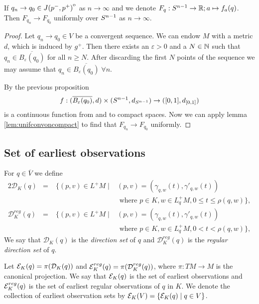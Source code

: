\begin{proposition}\label{prop:funif}
    If $q_n \to q_0\in {\kern0ptJ(p^-,p^+)}^{\mathrm{o}}$ as $n\to \infty$ and we denote $F_q:{S^{n-1}}\to\mathbb{R};a\mapsto f_a(q)$. Then $F_{q_n}\to F_{q_0}$ uniformly over ${S^{n-1}}$ as $n\to \infty$.
\end{proposition}
\begin{proof}
    Let $q_n \to q_0 \in V$ be a convergent sequence. We can endow $M$ with a metric $d$, which is induced by $g^+$. Then there exists an $\varepsilon>0$ and a $N\in \mathbb{N}$ such that $q_n\in \overline{B_\varepsilon(q_0)}$ for all $n\ge N$. After discarding the first $N$ points of the sequence we may assume that $q_n \in \overline{B_\varepsilon(q_0)} \; \forall n$.

    By the previous proposition 
    \begin{align*}
        f:(\overline{B_\varepsilon(q_0)},d)\times({S^{n-1}}, d_{{S^{n-1}}}) \to ([0,1],d_{[0,1]})
    \end{align*} is a continuous function from and to compact spaces. Now we can apply lemma \ref{lem:unifconvoncompact} to find that $F_{q_n}\to F_{q_0}$ uniformly.
     
\end{proof}

\subsection{Set of earliest observations}
\begin{definition}
For $q\in \overline{V}$ we define
\begin{alignat*}{2}
    \mathcal{D}_K(q) &=\; &\{(p,v)\in L^+M \mid &(p,v) = (\gamma_{q,w}(t),\gamma'_{q,w}(t)) \\
    &&&\text{ where } p\in K, w\in L_q^+M, 0\leq t \leq \rho(q,w)\},\\
    \mathcal{D}^{reg}_K(q) &=\; &\{(p,v)\in L^+M \mid &(p,v) = (\gamma_{q,w}(t),\gamma'_{q,w}(t)) \\
    &&&\text{ where } p\in K, w\in L_q^+M, 0 < t < \rho(q,w)\},
\end{alignat*}
We say that $\mathcal{D}_K(q)$ is the \emph{direction set} of $q$ and $\mathcal{D}^{reg}_K(q)$ is the \emph{regular direction set} of $q$.

Let ${\mathcal{E}}_K(q) = \pi(\mathcal{D}_K(q))$ and ${\mathcal{E}}^{reg}_K(q) = \pi(\mathcal{D}^{reg}_K(q))$, where $\pi:TM\to M$ is the canonical projection. We say that ${\mathcal{E}}_K(q)$ is the set of earliest observations and ${\mathcal{E}}^{reg}_K(q)$ is the set of earliest regular observations of $q$ in $K$. We denote the collection of earliest observation sets by ${\mathcal{E}}_K(V) = \{ {\mathcal{E}}_K(q) \mid q\in V\}$.
\end{definition}

